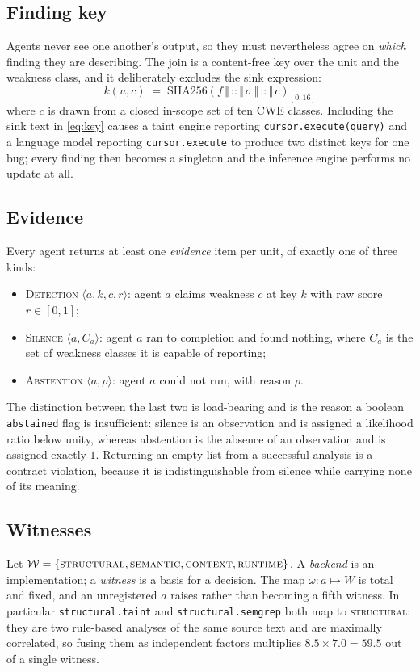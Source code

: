\documentclass[conference]{IEEEtran}
\newcommand{\Unit}{u}
\newcommand{\Wit}{\mathcal{W}}
\begin{document}
\subsection{Finding key}
Agents never see one another's output, so they must nevertheless agree on \emph{which}
finding they are describing. The join is a content-free key over the unit and the weakness
class, and it deliberately excludes the sink expression:
\begin{equation}
k(\Unit, c) \;=\; \mathrm{SHA256}\!\left(f \,\Vert\, \texttt{::} \,\Vert\, \sigma \,\Vert\, \texttt{::} \,\Vert\, c\right)_{[0:16]}
\label{eq:key}
\end{equation}
where $c$ is drawn from a closed in-scope set of ten CWE classes. Including the sink text in
\eqref{eq:key} causes a taint engine reporting \texttt{cursor.execute(query)} and a language
model reporting \texttt{cursor.execute} to produce two distinct keys for one bug; every
finding then becomes a singleton and the inference engine performs no update at all.

\subsection{Evidence}
Every agent returns at least one \emph{evidence} item per unit, of exactly one of three
kinds:
\begin{itemize}
\item \textsc{Detection} $\langle a, k, c, r \rangle$: agent $a$ claims weakness $c$ at key
$k$ with raw score $r \in [0,1]$;
\item \textsc{Silence} $\langle a, C_a \rangle$: agent $a$ ran to completion and found
nothing, where $C_a$ is the set of weakness classes it is capable of reporting;
\item \textsc{Abstention} $\langle a, \rho \rangle$: agent $a$ could not run, with reason
$\rho$.
\end{itemize}
The distinction between the last two is load-bearing and is the reason a boolean
\texttt{abstained} flag is insufficient: silence is an observation and is assigned a
likelihood ratio below unity, whereas abstention is the absence of an observation and is
assigned exactly $1$. Returning an empty list from a successful analysis is a contract
violation, because it is indistinguishable from silence while carrying none of its meaning.

\subsection{Witnesses}
Let $\Wit=\{\textsc{structural}, \textsc{semantic}, \textsc{context}, \textsc{runtime}\}$. A
\emph{backend} is an implementation; a \emph{witness} is a basis for a decision. The map
$\omega: a \mapsto W$ is total and fixed, and an unregistered $a$ raises rather than becoming
a fifth witness. In particular \texttt{structural.taint} and \texttt{structural.semgrep} both
map to \textsc{structural}: they are two rule-based analyses of the same source text and are
maximally correlated, so fusing them as independent factors multiplies
$8.5 \times 7.0 = 59.5$ out of a single witness.
\end{document}
